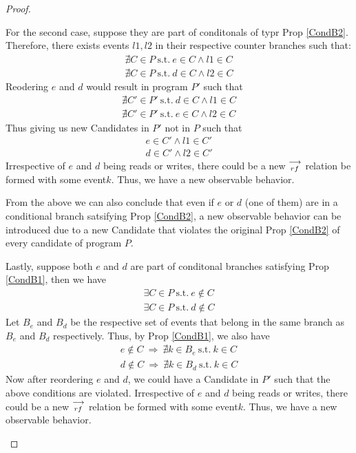 \begin{proof}
\begin{itemize}
                    For the second case, suppose they are part of conditonals of typr Prop \ref{CondB2}. Therefore, there exists events $l1, l2$ in their respective counter branches such that:
                    \begin{align*}
                        \nexists C \in P \ \text{s.t.} \ e \in C \wedge l1 \in C \\ 
                        \nexists C \in P \ \text{s.t.} \ d \in C \wedge l2 \in C 
                    \end{align*} 
                    Reodering $e$ and $d$ would result in program $P'$ such that
                    \begin{align*}
                        \nexists C' \in P' \ \text{s.t.} \ d \in C \wedge l1 \in C \\ 
                        \nexists C' \in P' \ \text{s.t.} \ e \in C \wedge l2 \in C  
                    \end{align*}  
                    Thus giving us new Candidates in $P'$ not in $P$ such that 
                    \begin{align*}
                        e \in C' \wedge l1 \in C' \\ 
                        d \in C' \wedge l2 \in C'
                    \end{align*}
                    Irrespective of $e$ and $d$ being reads or writes, there could be a new $\stackrel{\longrightarrow}{_{rf}}$ relation be formed with some event$k$. Thus, we have a new observable behavior. 

                    From the above we can also conclude that even if $e$ or $d$ (one of them) are in a conditional branch satsifying Prop \ref{CondB2}, a new observable behavior can be introduced due to a new Candidate that violates the original Prop \ref{CondB2} of every candidate of program $P$.

                    Lastly, suppose both $e$ and $d$ are part of conditonal branches satisfying Prop \ref{CondB1}, then we have 
                    \begin{align*}
                        \exists C \in P \ \text{s.t.} \ e \notin C \\
                        \exists C \in P \ \text{s.t.} \ d \notin C
                    \end{align*}
                    Let $B_e$ and $B_d$ be the respective set of events that belong in the same branch as $B_e$ and $B_d$ respectively. Thus, by Prop \ref{CondB1}, we also have 
                    \begin{align*}
                        e \notin C \ \Rightarrow \ \nexists k \in B_e \ \text{s.t.} \ k \in C \\
                        d \notin C \ \Rightarrow \ \nexists k \in B_d \ \text{s.t.} \ k \in C
                    \end{align*}
                    Now after reordering $e$ and $d$, we could have a Candidate in $P'$ such that the above conditions are violated. Irrespective of $e$ and $d$ being reads or writes, there could be a new $\stackrel{\longrightarrow}{_{rf}}$ relation be formed with some event$k$. Thus, we have a new observable behavior\footnotemark.  


\end{itemize}
\end{proof}
